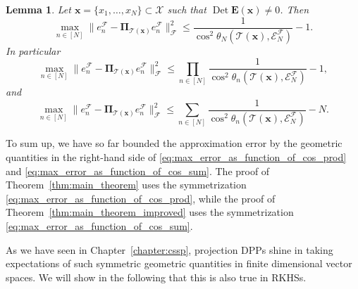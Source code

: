 \documentclass[twoside,11pt]{book}
\newtheorem{lemma}{Lemma}
\numberwithin{theorem}{chapter}
\numberwithin{definition}{chapter}
\numberwithin{proposition}{chapter}
\numberwithin{corollary}{chapter}
\numberwithin{example}{chapter}
\numberwithin{lemma}{chapter}
\numberwithin{assumption}{chapter}
\DeclareMathOperator{\Det}{Det}
\DeclareMathOperator{\F}{\mathcal{F}}
\begin{document}
\begin{lemma}\label{lemma:max_error_cos}
Let $\bm{x} = \{x_{1}, \dots , x_{N}\} \subset \mathcal{X}$ such that $\Det \bm{E}(\bm{x}) \neq 0$. Then
\begin{equation}\label{eq:max_error_as_function_of_cos}
	\max_{ n \in [N]} \|e_{n}^{\F} - \bm{\Pi}_{\mathcal{T}(\bm{x})} e_{n}^{\F}\|_{\mathcal{F}}^{2} \leq \frac{1}{\cos^{2} \theta_{N}(\mathcal{T}(\bm{x}),\mathcal{E}^{\mathcal{F}}_{N})} - 1. 
\end{equation}
In particular
\begin{equation}\label{eq:max_error_as_function_of_cos_prod}
\max_{ n \in [N]} \|e_{n}^{\F} - \bm{\Pi}_{\mathcal{T}(\bm{x})} e_{n}^{\F}\|_{\mathcal{F}}^{2} \leq \prod\limits_{n \in [N]}\frac{1}{\cos^{2} \theta_{n}(\mathcal{T}(\bm{x}),\mathcal{E}^{\mathcal{F}}_{N})} - 1,
\end{equation}
and
\begin{equation}\label{eq:max_error_as_function_of_cos_sum}
\max_{ n \in [N]} \|e_{n}^{\F} - \bm{\Pi}_{\mathcal{T}(\bm{x})} e_{n}^{\F}\|_{\mathcal{F}}^{2} \leq \sum\limits_{n \in [N]}\frac{1}{\cos^{2} \theta_{n}(\mathcal{T}(\bm{x}),\mathcal{E}^{\mathcal{F}}_{N})} - N.
\end{equation}
\end{lemma}





To sum up, we have so far bounded the approximation error by the geometric quantities in the right-hand side of \eqref{eq:max_error_as_function_of_cos_prod} and \eqref{eq:max_error_as_function_of_cos_sum}.
The proof of Theorem~\ref{thm:main_theorem} uses the symmetrization \eqref{eq:max_error_as_function_of_cos_prod}, while
the proof of Theorem~\ref{thm:main_theorem_improved} uses the symmetrization \eqref{eq:max_error_as_function_of_cos_sum}.

As we have seen in Chapter~\ref{chapter:cssp}, projection DPPs shine in taking expectations of such symmetric geometric quantities in finite dimensional vector spaces. We will show in the following that this is also true in RKHSs. 

\end{document}
